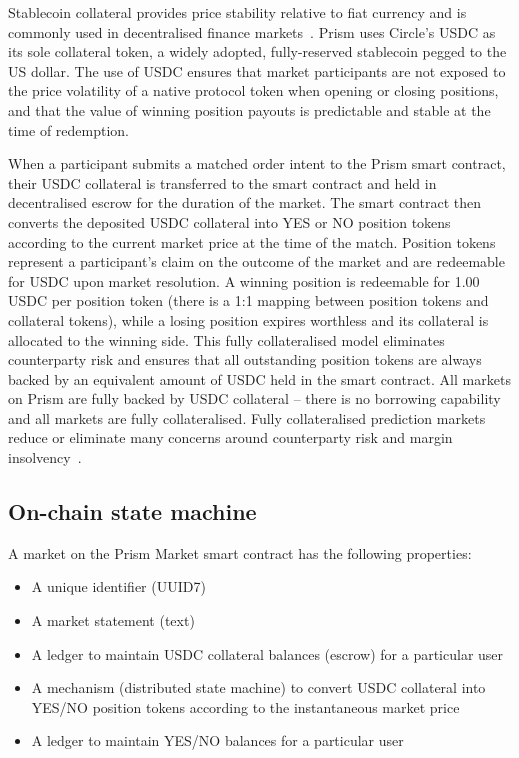\documentclass[11pt,a4paper]{article}
\begin{document}
Stablecoin collateral provides price stability relative to fiat currency and is commonly used in decentralised finance markets~\cite{wood_ethereum}\cite{lyons2020}. Prism uses Circle's USDC as its sole collateral token, a widely adopted, fully-reserved stablecoin pegged to the US dollar. The use of USDC ensures that market participants are not exposed to the price volatility of a native protocol token when opening or closing positions, and that the value of winning position payouts is predictable and stable at the time of redemption. 

When a participant submits a matched order intent to the Prism smart contract, their USDC collateral is transferred to the smart contract and held in decentralised escrow for the duration of the market. The smart contract then converts the deposited USDC collateral into YES or NO position tokens according to the current market price at the time of the match. Position tokens represent a participant's claim on the outcome of the market and are redeemable for USDC upon market resolution. A winning position is redeemable for 1.00 USDC per position token (there is a 1:1 mapping between position tokens and collateral tokens), while a losing position expires worthless and its collateral is allocated to the winning side. This fully collateralised model eliminates counterparty risk and ensures that all outstanding position tokens are always backed by an equivalent amount of USDC held in the smart contract. All markets on Prism are fully backed by USDC collateral -- there is no borrowing capability and all markets are fully collateralised. Fully collateralised prediction markets reduce or eliminate many concerns around counterparty risk and margin insolvency~\cite{hanson2003}.


\subsection{On-chain state machine}

A market on the Prism Market smart contract has the following properties:

\begin{itemize}[leftmargin=2em]
    \item A unique identifier (UUID7)
    \item A market statement (text)
    \item A ledger to maintain USDC collateral balances (escrow) for a particular user
    \item A mechanism (distributed state machine) to convert USDC collateral into YES/NO position tokens according to the instantaneous market price
    \item A ledger to maintain YES/NO balances for a particular user
\end{itemize}
\end{document}

